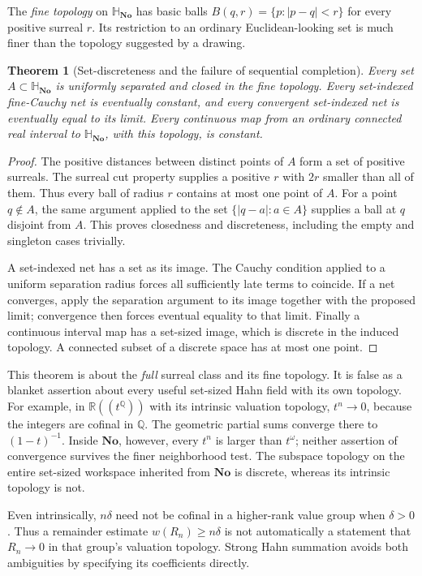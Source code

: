 \documentclass[11pt,letterpaper]{article}
\numberwithin{equation}{section}
\newtheorem{theorem}{Theorem}[section]
\theoremstyle{definition}
\theoremstyle{remark}
\newcommand{\No}{\mathbf{No}}
\newcommand{\SQ}{\mathbb H_{\No}}
\newcommand{\R}{\mathbb R}
\newcommand{\Q}{\mathbb Q}
\begin{document}
The \emph{fine topology} on $\SQ$ has basic balls
$B(q,r)=\{p:|p-q|<r\}$ for every positive surreal $r$. Its restriction to an ordinary
Euclidean-looking set is much finer than the topology suggested by a drawing.

\begin{theorem}[Set-discreteness and the failure of sequential completion]\label{thm:discrete}
Every set $A\subset\SQ$ is uniformly separated and closed in the fine topology. Every
set-indexed fine-Cauchy net is eventually constant, and every convergent set-indexed net is
eventually equal to its limit. Every continuous map from an ordinary connected real interval
to $\SQ$, with this topology, is constant.
\end{theorem}
\begin{proof}
The positive distances between distinct points of $A$ form a set of positive surreals. The
surreal cut property supplies a positive $r$ with $2r$ smaller than all of them. Thus every ball of
radius $r$ contains at most one point of $A$. For a point $q\notin A$, the same argument
applied to the set $\{|q-a|:a\in A\}$ supplies a ball at $q$ disjoint from $A$. This proves
closedness and discreteness, including the empty and singleton cases trivially.

A set-indexed net has a set as its image. The Cauchy condition applied to a uniform separation
radius forces all sufficiently late terms to coincide. If a net converges, apply the
separation argument to its image together with the proposed limit; convergence then forces
eventual equality to that limit. Finally a continuous interval map has a set-sized image,
which is discrete in the induced topology. A connected subset of a discrete space has at
most one point.
\end{proof}

This theorem is about the \emph{full} surreal class and its fine topology. It is false as a
blanket assertion about every useful set-sized Hahn field with its own topology.
For example, in $\R((t^\Q))$ with its intrinsic valuation topology, $t^n\to0$, because the
integers are cofinal in $\Q$. The geometric partial sums converge there to $(1-t)^{-1}$.
Inside $\No$, however, every $t^n$ is larger than $t^\omega$; neither assertion of convergence
survives the finer neighborhood test. The subspace topology on the entire set-sized
workspace inherited from $\No$ is discrete, whereas its intrinsic topology is not.

Even intrinsically, $n\delta$ need not be cofinal in a higher-rank value group when
$\delta>0$. Thus a remainder estimate $w(R_n)\ge n\delta$ is not automatically a statement
that $R_n\to0$ in that group's valuation topology. Strong Hahn summation avoids both
ambiguities by specifying its coefficients directly.
\end{document}
